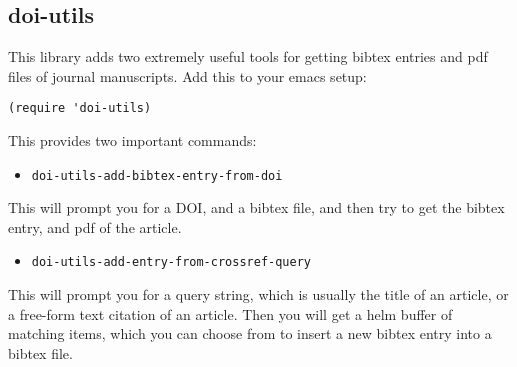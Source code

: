 \documentclass[11pt]{article}
\begin{document}
\subsection{doi-utils}
\label{sec-2-1}

This library adds two extremely useful tools for getting bibtex entries and pdf files of journal manuscripts. Add this to your emacs setup:
\begin{verbatim}
(require 'doi-utils)
\end{verbatim}

This provides two important commands:

\begin{itemize}
\item \verb~doi-utils-add-bibtex-entry-from-doi~
\end{itemize}
This will prompt you for a DOI, and a bibtex file, and then try to get the bibtex entry, and pdf of the article.

\begin{itemize}
\item \verb~doi-utils-add-entry-from-crossref-query~
\end{itemize}
This will prompt you for a query string, which is usually the title of an article, or a free-form text citation of an article. Then you will get a helm buffer of matching items, which you can choose from to insert a new bibtex entry into a bibtex file.
\end{document}
